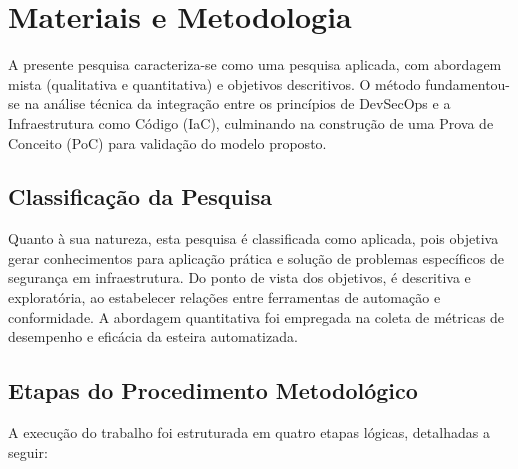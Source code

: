 \chapter{Materiais e Metodologia}

A presente pesquisa caracteriza-se como uma pesquisa aplicada, com abordagem mista (qualitativa e quantitativa) e objetivos descritivos. O método fundamentou-se na análise técnica da integração entre os princípios de DevSecOps e a Infraestrutura como Código (IaC), culminando na construção de uma Prova de Conceito (PoC) para validação do modelo proposto.

\section{Classificação da Pesquisa}
Quanto à sua natureza, esta pesquisa é classificada como aplicada, pois objetiva gerar conhecimentos para aplicação prática e solução de problemas específicos de segurança em infraestrutura. Do ponto de vista dos objetivos, é descritiva e exploratória, ao estabelecer relações entre ferramentas de automação e conformidade. A abordagem quantitativa foi empregada na coleta de métricas de desempenho e eficácia da esteira automatizada.

\section{Etapas do Procedimento Metodológico}
A execução do trabalho foi estruturada em quatro etapas lógicas, detalhadas a seguir:


